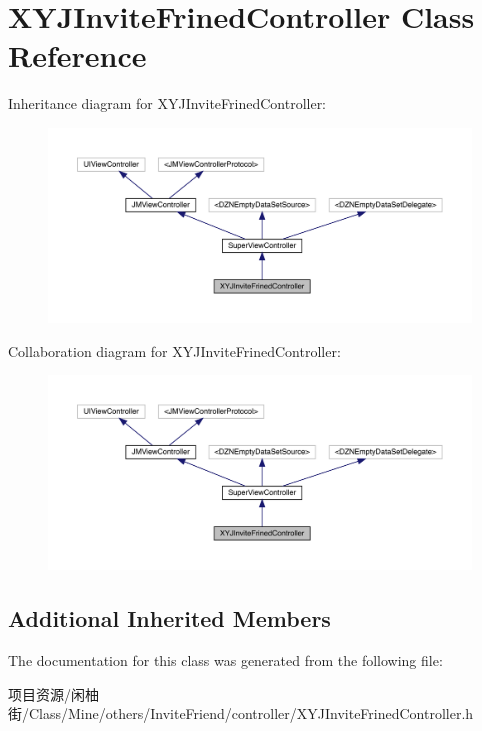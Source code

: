 \hypertarget{interface_x_y_j_invite_frined_controller}{}\section{X\+Y\+J\+Invite\+Frined\+Controller Class Reference}
\label{interface_x_y_j_invite_frined_controller}


Inheritance diagram for X\+Y\+J\+Invite\+Frined\+Controller\+:\nopagebreak
\begin{figure}[H]
\begin{center}
\leavevmode
\includegraphics[width=350pt]{interface_x_y_j_invite_frined_controller__inherit__graph}
\end{center}
\end{figure}


Collaboration diagram for X\+Y\+J\+Invite\+Frined\+Controller\+:\nopagebreak
\begin{figure}[H]
\begin{center}
\leavevmode
\includegraphics[width=350pt]{interface_x_y_j_invite_frined_controller__coll__graph}
\end{center}
\end{figure}
\subsection*{Additional Inherited Members}


The documentation for this class was generated from the following file\+:\begin{DoxyCompactItemize}
\item 
项目资源/闲柚街/\+Class/\+Mine/others/\+Invite\+Friend/controller/X\+Y\+J\+Invite\+Frined\+Controller.\+h\end{DoxyCompactItemize}
